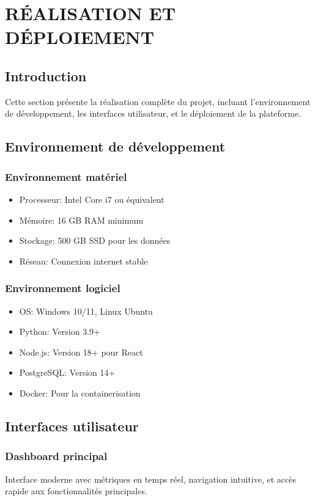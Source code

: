 \documentclass[12pt,a4paper]{article}
\begin{document}
\section{RÉALISATION ET DÉPLOIEMENT}

\subsection{Introduction}
Cette section présente la réalisation complète du projet, incluant l'environnement de développement, les interfaces utilisateur, et le déploiement de la plateforme.

\subsection{Environnement de développement}
\subsubsection{Environnement matériel}
\begin{itemize}
    \item Processeur: Intel Core i7 ou équivalent
    \item Mémoire: 16 GB RAM minimum
    \item Stockage: 500 GB SSD pour les données
    \item Réseau: Connexion internet stable
\end{itemize}

\subsubsection{Environnement logiciel}
\begin{itemize}
    \item OS: Windows 10/11, Linux Ubuntu
    \item Python: Version 3.9+
    \item Node.js: Version 18+ pour React
    \item PostgreSQL: Version 14+
    \item Docker: Pour la containerisation
\end{itemize}

\subsection{Interfaces utilisateur}
\subsubsection{Dashboard principal}
Interface moderne avec métriques en temps réel, navigation intuitive, et accès rapide aux fonctionnalités principales.
\end{document}
